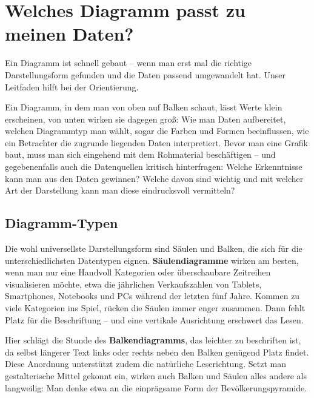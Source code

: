 %
%
%
%


%


\chapter{Welches Diagramm passt zu meinen Daten?}

Ein Diagramm ist schnell gebaut -- wenn man erst mal die richtige Darstellungsform gefunden und die Daten passend umgewandelt hat. Unser Leitfaden hilft bei der Orientierung.


Ein Diagramm, in dem man von oben auf Balken schaut, lässt Werte klein erscheinen, von unten wirken sie dagegen groß: Wie man Daten aufbereitet, welchen Diagrammtyp man wählt, sogar die Farben und Formen beeinflussen, wie ein Betrachter die zugrunde liegenden Daten interpretiert. Bevor man eine Grafik baut, muss man sich eingehend mit dem Rohmaterial beschäftigen – und gegebenenfalls auch die Datenquellen kritisch hinterfragen: Welche Erkenntnisse kann man aus den Daten gewinnen? Welche davon sind wichtig und mit welcher Art der Darstellung kann man diese eindrucksvoll vermitteln?


\section{Diagramm-Typen}


Die wohl universellste Darstellungsform sind Säulen und Balken, die sich für die unterschiedlichsten Datentypen eignen. \textbf{Säulendiagramme} wirken am besten, wenn man nur eine Handvoll Kategorien oder überschaubare Zeitreihen visualisieren möchte, etwa die jährlichen Verkaufszahlen von Tablets, Smartphones, Notebooks und PCs während der letzten fünf Jahre. Kommen zu viele Kategorien ins Spiel, rücken die Säulen immer enger zusammen. Dann fehlt Platz für die Beschriftung -- und eine vertikale Ausrichtung erschwert das Lesen.

Hier schlägt die Stunde des \textbf{Balkendiagramms}, das leichter zu beschriften ist, da selbst längerer Text links oder rechts neben den Balken genügend Platz findet. Diese Anordnung unterstützt zudem die natürliche Leserichtung. Setzt man gestalterische Mittel gekonnt ein, wirken auch Balken und Säulen alles andere als langweilig: Man denke etwa an die einprägsame Form der Bevölkerungspyramide.

